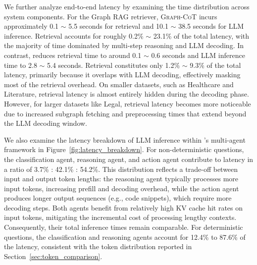 We further analyze end-to-end latency by examining the time distribution across system components. For the Graph RAG retriever, \textsc{Graph-CoT} incurs approximately 0.1 $\sim$ 5.5 seconds for retrieval and 10.1 $\sim$ 38.5 seconds for LLM inference. Retrieval accounts for roughly 0.2\% $\sim$ 23.1\% of the total latency, with the majority of time dominated by multi-step reasoning and LLM decoding. In contrast, \projectname reduces retrieval time to around 0.1 $\sim$ 0.6 seconds and LLM inference time to 2.8 $\sim$ 5.4 seconds. Retrieval constitutes only 1.2\% $\sim$ 9.3\% of the total latency, primarily because it overlaps with LLM decoding, effectively masking most of the retrieval overhead. On smaller datasets, such as Healthcare and Literature, retrieval latency is almost entirely hidden during the decoding phase. However, for larger datasets like Legal, retrieval latency becomes more noticeable due to increased subgraph fetching and preprocessing times that extend beyond the LLM decoding window.

We also examine the latency breakdown of LLM inference within \projectname’s multi-agent framework in Figure~\ref{fig:latency_breakdown}. For non-deterministic questions, the classification agent, reasoning agent, and action agent contribute to latency in a ratio of 3.7\% : 42.1\% : 54.2\%. This distribution reflects a trade-off between input and output token lengths: the reasoning agent typically processes more input tokens, increasing prefill and decoding overhead, while the action agent produces longer output sequences (e.g., code snippets), which require more decoding steps. Both agents benefit from relatively high KV cache hit rates on input tokens, mitigating the incremental cost of processing lengthy contexts. Consequently, their total inference times remain comparable. For deterministic questions, the classification and reasoning agents account for 12.4\% to 87.6\% of the latency, consistent with the token distribution reported in Section~\ref{sec:token_comparison}.


